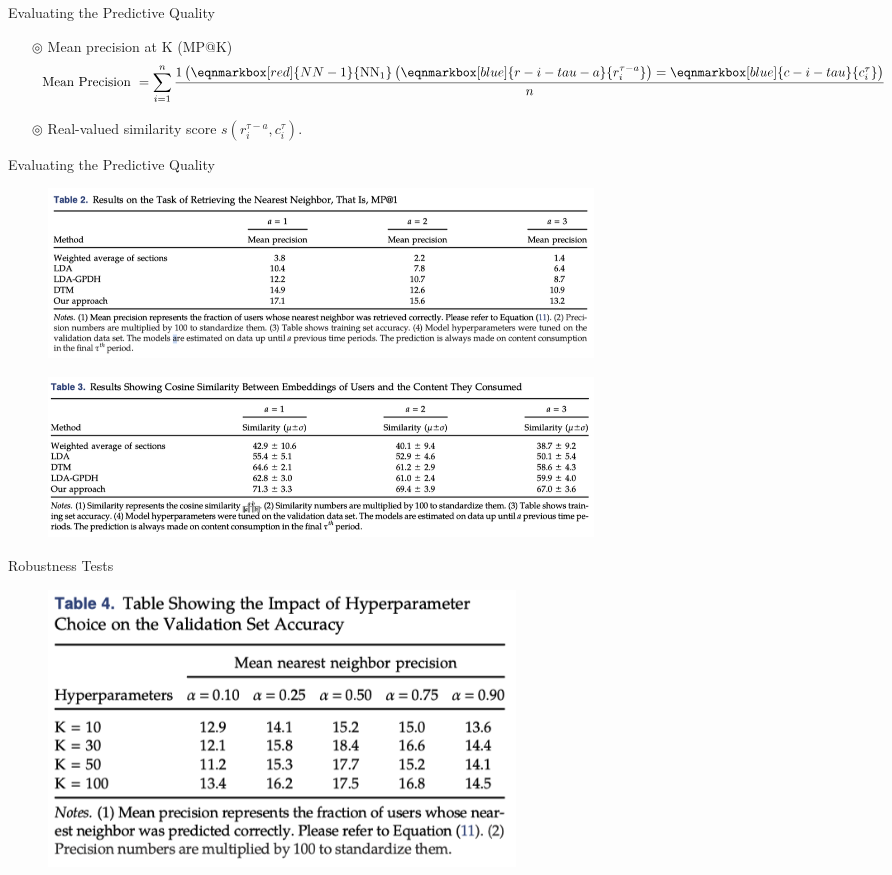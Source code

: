 \documentclass{beamer}
\begin{document}
\begin{frame}{Evaluating the Predictive Quality}
	\begin{itemize}
		\item[$\circledcirc$] Mean precision at K (MP@K)
		      \begin{align*}
			      \text { Mean Precision }=\sum_{i=1}^n \frac{1\left(\eqnmarkbox[red]{NN-1}{\mathrm{NN}_1}\left(\eqnmarkbox[blue]{r-i-tau-a}{r_i^{\tau-a}}\right)=\eqnmarkbox[blue]{c-i-tau}{c_i^\tau}\right)}{n}
		      \end{align*}

		\item[$\circledcirc$] Real-valued similarity score $s\left(r_i^{\tau-a}, c_i^\tau\right)$.
	\end{itemize}
\end{frame}

\begin{frame}{Evaluating the Predictive Quality}
	\begin{figure}[htpb]
		\centering
		\includegraphics[width=0.7\textwidth]{pic/prediction-eval.png}
	\end{figure}
	\begin{figure}[htpb]
		\centering
		\includegraphics[width=0.7\textwidth]{pic/sim.png}
	\end{figure}
\end{frame}

\begin{frame}{Robustness Tests}
	\begin{figure}[htpb]
		\centering
		\includegraphics[width=0.6\textwidth]{pic/robustness.png}
	\end{figure}
\end{frame}
\end{document}
